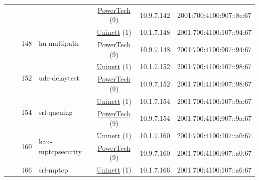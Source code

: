 \begin{small}
\begin{center}
\begin{longtable}{|c|c|c|c|c|c|c|c|}
  &  &  &  & \multicolumn{2}{|c|}{\tiny{\href{http://www.powertech.no}{PowerTech} (9)}} & \tiny{10.9.7.142} & \tiny{2001:700:4100:907::8e:67} \\* \cline{3-3}\cline{4-4}\cline{5-5}\cline{6-6}\cline{7-7}\cline{8-8}
  &  & \multirow{2}{*}{\tiny{148}} & \multicolumn{1}{|l|}{\multirow{2}{*}{\tiny{hu-multipath}}} & \multicolumn{2}{|c|}{\tiny{\href{https://www.uninett.no}{Uninett} (1)}} & \tiny{10.1.7.148} & \tiny{2001:700:4100:107::94:67} \\* \cline{5-5}\cline{6-6}\cline{7-7}\cline{8-8}
  &  &  &  & \multicolumn{2}{|c|}{\tiny{\href{http://www.powertech.no}{PowerTech} (9)}} & \tiny{10.9.7.148} & \tiny{2001:700:4100:907::94:67} \\* \cline{3-3}\cline{4-4}\cline{5-5}\cline{6-6}\cline{7-7}\cline{8-8}
  &  & \multirow{2}{*}{\tiny{152}} & \multicolumn{1}{|l|}{\multirow{2}{*}{\tiny{ude-delaytest}}} & \multicolumn{2}{|c|}{\tiny{\href{https://www.uninett.no}{Uninett} (1)}} & \tiny{10.1.7.152} & \tiny{2001:700:4100:107::98:67} \\* \cline{5-5}\cline{6-6}\cline{7-7}\cline{8-8}
  &  &  &  & \multicolumn{2}{|c|}{\tiny{\href{http://www.powertech.no}{PowerTech} (9)}} & \tiny{10.9.7.152} & \tiny{2001:700:4100:907::98:67} \\* \cline{3-3}\cline{4-4}\cline{5-5}\cline{6-6}\cline{7-7}\cline{8-8}
  &  & \multirow{2}{*}{\tiny{154}} & \multicolumn{1}{|l|}{\multirow{2}{*}{\tiny{srl-queuing}}} & \multicolumn{2}{|c|}{\tiny{\href{https://www.uninett.no}{Uninett} (1)}} & \tiny{10.1.7.154} & \tiny{2001:700:4100:107::9a:67} \\* \cline{5-5}\cline{6-6}\cline{7-7}\cline{8-8}
  &  &  &  & \multicolumn{2}{|c|}{\tiny{\href{http://www.powertech.no}{PowerTech} (9)}} & \tiny{10.9.7.154} & \tiny{2001:700:4100:907::9a:67} \\* \cline{3-3}\cline{4-4}\cline{5-5}\cline{6-6}\cline{7-7}\cline{8-8}
  &  & \multirow{2}{*}{\tiny{160}} & \multicolumn{1}{|l|}{\multirow{2}{*}{\tiny{kau-mptcpsecurity}}} & \multicolumn{2}{|c|}{\tiny{\href{https://www.uninett.no}{Uninett} (1)}} & \tiny{10.1.7.160} & \tiny{2001:700:4100:107::a0:67} \\* \cline{5-5}\cline{6-6}\cline{7-7}\cline{8-8}
  &  &  &  & \multicolumn{2}{|c|}{\tiny{\href{http://www.powertech.no}{PowerTech} (9)}} & \tiny{10.9.7.160} & \tiny{2001:700:4100:907::a0:67} \\* \cline{3-3}\cline{4-4}\cline{5-5}\cline{6-6}\cline{7-7}\cline{8-8}
  &  & \multirow{2}{*}{\tiny{166}} & \multicolumn{1}{|l|}{\multirow{2}{*}{\tiny{srl-mptcp}}} & \multicolumn{2}{|c|}{\tiny{\href{https://www.uninett.no}{Uninett} (1)}} & \tiny{10.1.7.166} & \tiny{2001:700:4100:107::a6:67} \\* \cline{5-5}\cline{6-6}\cline{7-7}\cline{8-8}

\end{longtable}
\end{center}
\end{small}
